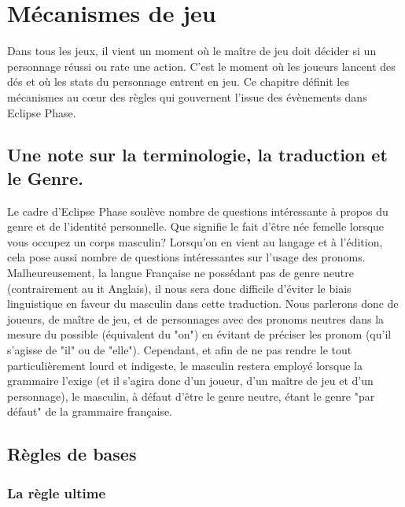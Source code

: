 \chapter{Mécanismes de jeu} \label{chap:game-mechanics} 

Dans tous les jeux, il vient un moment où le maître de jeu doit décider si un personnage réussi ou rate une action. C'est le moment où les joueurs lancent des dés et où les stats du personnage entrent en jeu. Ce chapitre définit les mécanismes au cœur des règles qui gouvernent l'issue des évènements dans Eclipse Phase. 

\section{Une note sur la terminologie, la traduction et le Genre.} Le cadre d'Eclipse Phase soulève nombre de questions intéressante à propos du genre et de l'identité personnelle. Que signifie le fait d'être née femelle lorsque vous occupez un corps masculin? Lorsqu'on en vient au langage et à l'édition, cela pose aussi nombre de questions intéressantes sur l'usage des pronoms. Malheureusement, la langue Française ne possédant pas de genre neutre (contrairement au it Anglais), il nous sera donc difficile d'éviter le biais linguistique en faveur du masculin dans cette traduction.   Nous parlerons donc de joueurs, de maître de jeu, et de personnages avec des pronoms neutres dans la mesure du possible (équivalent du "on") en évitant de préciser les pronom (qu'il s'agisse de "il" ou de "elle"). Cependant, et afin de ne pas rendre le tout particulièrement lourd et indigeste, le masculin restera employé lorsque la grammaire l'exige (et il s'agira donc d'un joueur, d'un maître de jeu et d'un personnage), le masculin, à défaut d'être le genre neutre, étant le genre "par défaut" de la grammaire française.   



\section{Règles de bases} \label{sec:basics} 

\subsection{La règle ultime} \label{sec:ultimate-rule} 

